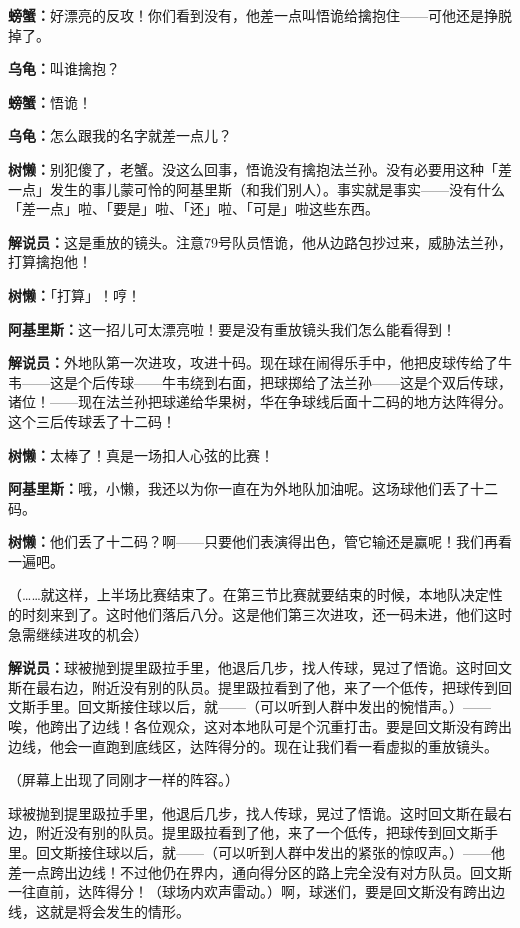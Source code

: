 \documentclass[
  12pt,
  twoside,
  openright,
  oldfontcommands,
]{memoir}
\newcommand{\kaitismall}[1]{{\kaitifamily\small #1}}
\newcommand{\dialogname}[1]{{\heifamily\bfseries #1}}
\begin{document}
\dialogname{螃蟹：}好漂亮的反攻！你们看到没有，他差一点叫悟诡给擒抱住------可他还是挣脱掉了。

\dialogname{乌龟：}叫谁擒抱？

\dialogname{螃蟹：}悟诡！

\dialogname{乌龟：}怎么跟我的名字就差一点儿？

\dialogname{树懒：}别犯傻了，老蟹。没这么回事，悟诡没有擒抱法兰孙。没有必要用这种「差一点」发生的事儿蒙可怜的阿基里斯（和我们别人）。事实就是事实------没有什么「差一点」啦、「要是」啦、「还」啦、「可是」啦这些东西。

\dialogname{解说员：}这是重放的镜头。注意79号队员悟诡，他从边路包抄过来，威胁法兰孙，打算擒抱他！

\dialogname{树懒：}「打算」！哼！

\dialogname{阿基里斯：}这一招儿可太漂亮啦！要是没有重放镜头我们怎么能看得到！

\dialogname{解说员：}外地队第一次进攻，攻进十码。现在球在闹得乐手中，他把皮球传给了牛韦------这是个后传球------牛韦绕到右面，把球掷给了法兰孙------这是个双后传球，诸位！------现在法兰孙把球递给华果树，华在争球线后面十二码的地方达阵得分。这个三后传球丢了十二码！

\dialogname{树懒：}太棒了！真是一场扣人心弦的比赛！

\dialogname{阿基里斯：}哦，小懒，我还以为你一直在为外地队加油呢。这场球他们丢了十二码。

\dialogname{树懒：}他们丢了十二码？啊------只要他们表演得出色，管它输还是赢呢！我们再看一遍吧。

（\ldots\ldots 就这样，上半场比赛结束了。在第三节比赛就要结束的时候，本地队决定性的时刻来到了。这时他们落后八分。这是他们第三次进攻，还一码未进，他们这时急需继续进攻的机会）

\dialogname{解说员：}球被抛到提里趿拉手里，他退后几步，找人传球，晃过了悟诡。这时回文斯在最右边，附近没有别的队员。提里趿拉看到了他，来了一个低传，把球传到回文斯手里。回文斯接住球以后，就------\kaitismall{（可以听到人群中发出的惋惜声。）}------唉，他跨出了边线！各位观众，这对本地队可是个沉重打击。要是回文斯没有跨出边线，他会一直跑到底线区，达阵得分的。现在让我们看一看虚拟的重放镜头。

（屏幕上出现了同刚才一样的阵容。）

球被抛到提里趿拉手里，他退后几步，找人传球，晃过了悟诡。这时回文斯在最右边，附近没有别的队员。提里趿拉看到了他，来了一个低传，把球传到回文斯手里。回文斯接住球以后，就------\kaitismall{（可以听到人群中发出的紧张的惊叹声。）}------他差一点跨出边线！不过他仍在界内，通向得分区的路上完全没有对方队员。回文斯一往直前，达阵得分！\kaitismall{（球场内欢声雷动。）}啊，球迷们，要是回文斯没有跨出边线，这就是将会发生的情形。
\end{document}
